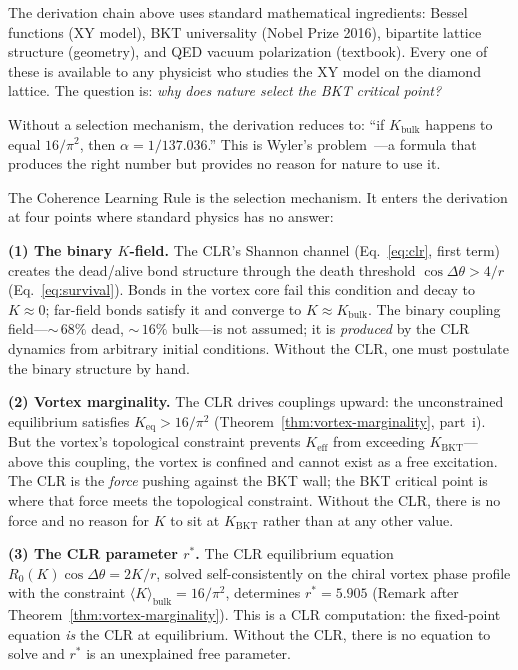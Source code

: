 \documentclass[aps,prd,onecolumn,superscriptaddress,floatfix,12pt]{revtex4-2}
\newcommand{\Rzero}{R_0}
\newcommand{\Kbulk}{K_{\text{bulk}}}
\newcommand{\KBKT}{K_{\text{BKT}}}
\begin{document}
The derivation chain above uses standard mathematical ingredients: Bessel functions (XY model), BKT universality (Nobel Prize 2016), bipartite lattice structure (geometry), and QED vacuum polarization (textbook). Every one of these is available to any physicist who studies the XY model on the diamond lattice. The question is: \emph{why does nature select the BKT critical point?}

Without a selection mechanism, the derivation reduces to: ``if $\Kbulk$ happens to equal $16/\pi^2$, then $\alpha = 1/137.036$.'' This is Wyler's problem~\cite{Wyler1969}---a formula that produces the right number but provides no reason for nature to use it.

The Coherence Learning Rule is the selection mechanism. It enters the derivation at four points where standard physics has no answer:

\textbf{(1) The binary $K$-field.} The CLR's Shannon channel (Eq.~\ref{eq:clr}, first term) creates the dead/alive bond structure through the death threshold $\cos\Delta\theta > 4/r$ (Eq.~\ref{eq:survival}). Bonds in the vortex core fail this condition and decay to $K \approx 0$; far-field bonds satisfy it and converge to $K \approx \Kbulk$. The binary coupling field---${\sim}\,68\%$ dead, ${\sim}\,16\%$ bulk---is not assumed; it is \emph{produced} by the CLR dynamics from arbitrary initial conditions. Without the CLR, one must postulate the binary structure by hand.

\textbf{(2) Vortex marginality.} The CLR drives couplings upward: the unconstrained equilibrium satisfies $K_{\text{eq}} > 16/\pi^2$ (Theorem~\ref{thm:vortex-marginality}, part~i). But the vortex's topological constraint prevents $K_{\text{eff}}$ from exceeding $\KBKT$---above this coupling, the vortex is confined and cannot exist as a free excitation. The CLR is the \emph{force} pushing against the BKT wall; the BKT critical point is where that force meets the topological constraint. Without the CLR, there is no force and no reason for $K$ to sit at $\KBKT$ rather than at any other value.

\textbf{(3) The CLR parameter $r^*$.} The CLR equilibrium equation $\Rzero(K)\cos\Delta\theta = 2K/r$, solved self-consistently on the chiral vortex phase profile with the constraint $\langle K \rangle_{\text{bulk}} = 16/\pi^2$, determines $r^* = 5.905$ (Remark after Theorem~\ref{thm:vortex-marginality}). This is a CLR computation: the fixed-point equation \emph{is} the CLR at equilibrium. Without the CLR, there is no equation to solve and $r^*$ is an unexplained free parameter.
\end{document}
